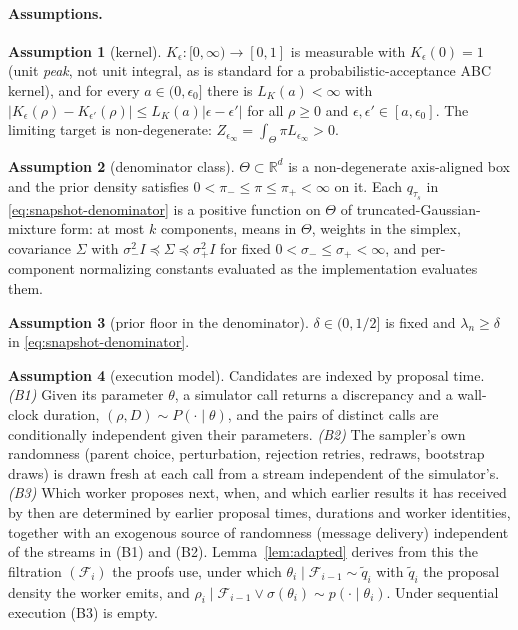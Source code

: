 \documentclass[10pt]{article}
\theoremstyle{plain}
\theoremstyle{definition}
\newtheorem{assumption}{Assumption}
\begin{document}
\paragraph{Assumptions.}
\begin{assumption}[kernel]\label{ass:kernel} $K_\epsilon:[0,\infty)\to[0,1]$ is measurable with $K_\epsilon(0)=1$ (unit \emph{peak}, not unit integral, as is standard for a probabilistic-acceptance ABC kernel), and for every $a\in(0,\epsilon_0]$ there is $L_K(a)<\infty$ with $|K_\epsilon(\rho)-K_{\epsilon'}(\rho)|\le L_K(a)|\epsilon-\epsilon'|$ for all $\rho\ge0$ and $\epsilon,\epsilon'\in[a,\epsilon_0]$. The limiting target is non-degenerate: $Z_{\epsilon_\infty}=\int_\Theta\pi L_{\epsilon_\infty}>0$.\end{assumption}
\begin{assumption}[denominator class]\label{ass:class} $\Theta\subset\mathbb{R}^d$ is a non-degenerate axis-aligned box and the prior density satisfies $0<\pi_-\le\pi\le\pi_+<\infty$ on it. Each $q_{\tau_s}$ in \eqref{eq:snapshot-denominator} is a positive function on $\Theta$ of truncated-Gaussian-mixture form: at most $k$ components, means in $\Theta$, weights in the simplex, covariance $\Sigma$ with $\sigma_-^2I\preceq\Sigma\preceq\sigma_+^2I$ for fixed $0<\sigma_-\le\sigma_+<\infty$, and per-component normalizing constants evaluated as the implementation evaluates them.\end{assumption}
\begin{assumption}[prior floor in the denominator]\label{ass:defensive} $\delta\in(0,1/2]$ is fixed and $\lambda_n\ge\delta$ in \eqref{eq:snapshot-denominator}.\end{assumption}
\begin{assumption}[execution model]\label{ass:filtration} Candidates are indexed by proposal time. \emph{(B1)} Given its parameter $\theta$, a simulator call returns a discrepancy and a wall-clock duration, $(\rho,D)\sim P(\cdot\mid\theta)$, and the pairs of distinct calls are conditionally independent given their parameters. \emph{(B2)} The sampler's own randomness (parent choice, perturbation, rejection retries, redraws, bootstrap draws) is drawn fresh at each call from a stream independent of the simulator's. \emph{(B3)} Which worker proposes next, when, and which earlier results it has received by then are determined by earlier proposal times, durations and worker identities, together with an exogenous source of randomness (message delivery) independent of the streams in (B1) and (B2). Lemma~\ref{lem:adapted} derives from this the filtration $(\mathcal{F}_i)$ the proofs use, under which $\theta_i\mid\mathcal{F}_{i-1}\sim\tilde q_i$ with $\tilde q_i$ the proposal density the worker emits, and $\rho_i\mid\mathcal{F}_{i-1}\vee\sigma(\theta_i)\sim p(\cdot\mid\theta_i)$. Under sequential execution (B3) is empty.\end{assumption}
\end{document}
